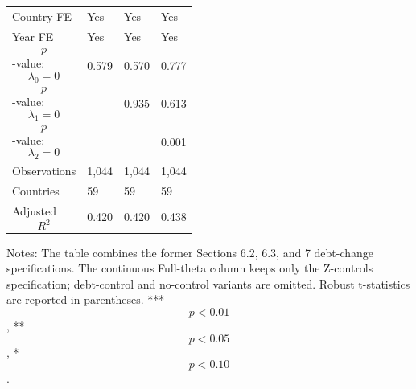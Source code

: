 \begin{table}[H]
\begin{threeparttable}
\begin{tabularx}{\textwidth}{lYYY}
Country FE & Yes & Yes & Yes \\
Year FE & Yes & Yes & Yes \\
$$p$$-value: $$\lambda_0=0$$ & 0.579 & 0.570 & 0.777 \\
$$p$$-value: $$\lambda_1=0$$ &  & 0.935 & 0.613 \\
$$p$$-value: $$\lambda_2=0$$ &  &  & 0.001 \\
Observations & 1,044 & 1,044 & 1,044 \\
Countries & 59 & 59 & 59 \\
Adjusted $$R^2$$ & 0.420 & 0.420 & 0.438 \\
\bottomrule
\end{tabularx}
\begin{tablenotes}[flushleft]\footnotesize
\item Notes: The table combines the former Sections 6.2, 6.3, and 7 debt-change specifications. The continuous Full-theta column keeps only the Z-controls specification; debt-control and no-control variants are omitted. Robust t-statistics are reported in parentheses. *** $$p<0.01$$, ** $$p<0.05$$, * $$p<0.10$$.
\end{tablenotes}
\end{threeparttable}
\end{table}
